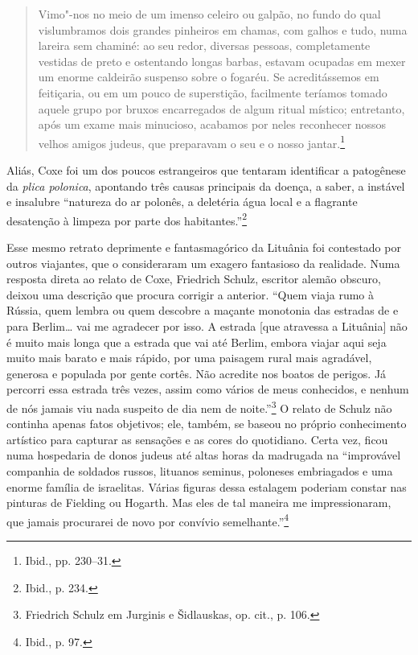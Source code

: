 \begin{quote}
Vimo"-nos no meio de um imenso celeiro ou galpão, no fundo do qual
vislumbramos dois grandes pinheiros em chamas, com galhos e tudo, numa
lareira sem chaminé: ao seu redor, diversas pessoas, completamente
vestidas de preto e ostentando longas barbas, estavam ocupadas em
mexer um enorme caldeirão suspenso sobre o fogaréu. Se acreditássemos em
feitiçaria, ou em um pouco de superstição, facilmente teríamos tomado
aquele grupo por bruxos encarregados de algum ritual místico;
entretanto, após um exame mais minucioso, acabamos por neles reconhecer
nossos velhos amigos judeus, que preparavam o seu e o nosso
jantar.\footnote{Ibid., pp. 230--31.}
\end{quote}

Aliás, Coxe foi um dos poucos estrangeiros que tentaram identificar a
patogênese da \textit{plica polonica}, apontando três causas principais da
doença, a saber, a instável e insalubre ``natureza do ar polonês, a
deletéria água local e a flagrante desatenção à limpeza por parte dos
habitantes.''\footnote{Ibid., p. 234.}

Esse mesmo retrato deprimente e fantasmagórico da Lituânia foi
contestado por outros viajantes, que o consideraram um exagero
fantasioso da realidade. Numa resposta direta ao relato de Coxe,
Friedrich Schulz, escritor alemão obscuro, deixou uma descrição que
procura corrigir a anterior. ``Quem viaja rumo à Rússia, quem lembra ou
quem descobre a maçante monotonia das estradas de e para Berlim\ldots{}
vai me agradecer por isso. A estrada {[}que atravessa a Lituânia{]} não
é muito mais longa que a estrada que vai até Berlim, embora viajar aqui
seja muito mais barato e mais rápido, por uma paisagem rural mais
agradável, generosa e populada por gente cortês. Não acredite nos boatos
de perigos. Já percorri essa estrada três vezes, assim como vários de
meus conhecidos, e nenhum de nós jamais viu nada suspeito de dia nem de
noite.''\footnote{Friedrich Schulz em Jurginis e Šidlauskas, op. cit., p. 106.} O relato de Schulz não continha apenas fatos objetivos; ele, também, se baseou no próprio conhecimento artístico para capturar as
sensações e as cores do quotidiano. Certa vez, ficou numa hospedaria de
donos judeus até altas horas da madrugada na ``improvável companhia de
soldados russos, lituanos seminus, poloneses embriagados e uma enorme
família de israelitas. Várias figuras dessa estalagem poderiam constar
nas pinturas de Fielding ou Hogarth. Mas eles de tal maneira me
impressionaram, que jamais procurarei de novo por convívio
semelhante.''\footnote{Ibid., p. 97.}

